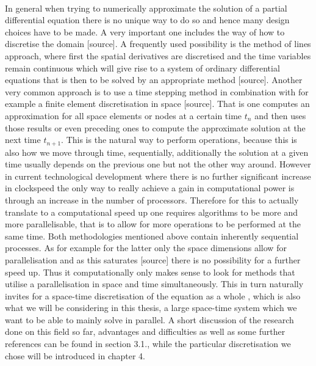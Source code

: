 \documentclass[../draft_1.tex]{subfiles}
\begin{document}
\smallskip
\\
In general when trying to numerically approximate the solution of a partial differential equation there is no unique way to do so and hence many design choices have to be made. A very important one includes the way of how to discretise the domain [source]. A frequently used possibility is the method of lines approach, where first the spatial derivatives are discretised and the time variables remain continuous which will give rise to a system of ordinary differential equations that is then to be solved by an appropriate method [source]. Another very common approach is to use a time stepping method in combination with for example a finite element discretisation in space [source]. That is one computes an approximation for all space elements or nodes at a certain time $t_n$ and then uses those results or even preceding ones to compute the approximate solution at the next time $t_{n+1}$. This is the natural way to perform operations, because this is also how we move through time, sequentially, additionally the solution at a given time usually depends on the previous one but not the other way around. 
However in current technological development where there is no further significant increase in clockspeed the only way to really achieve a gain in computational power is through an increase in the number of processors. Therefore for this to actually translate to a computational speed up one requires algorithms to be more and more parallelisable, that is to allow for more operations to be performed at the same time. Both methodologies mentioned above contain inherently sequential processes. As for example for the latter only the space dimensions allow for parallelisation and as this saturates [source] there is no possibility for a further speed up. Thus it computationally only makes sense to look for methods that utilise a parallelisation in space and time simultaneously. This in turn naturally invites for a space-time discretisation of the equation as a whole \cite{gander201550}, which is also what we will be considering in this thesis, a large space-time system which we want to be able to mainly solve in parallel. A short discussion of the research done on this field so far, advantages and difficulties as well as some further references can be found in section 3.1., while the particular discretisation we chose will be introduced in chapter 4.
\bigskip
\\
\end{document}
